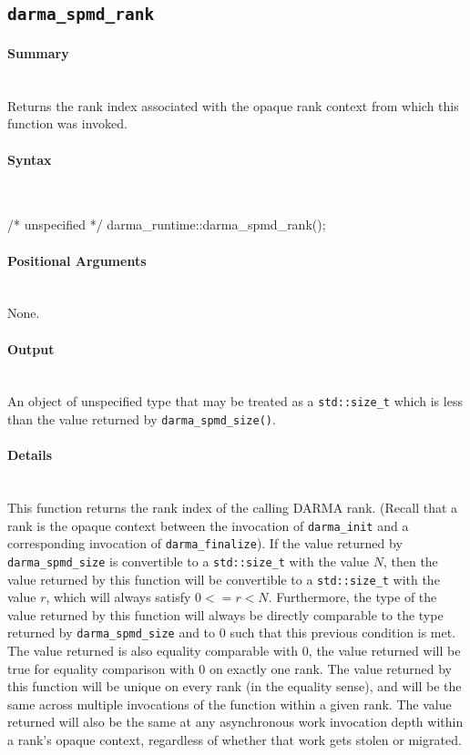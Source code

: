


\subsection{\texttt{darma\_spmd\_rank}}

\paragraph{Summary}\mbox{}\\
Returns the rank index associated with the opaque rank context from which this
function was invoked.

\paragraph{Syntax}\mbox{}\\
\begin{CppCode}
/* unspecified */ darma_runtime::darma_spmd_rank();
\end{CppCode}

\paragraph{Positional Arguments} \mbox{}\\
None. 

\paragraph{Output}\mbox{}\\
An object of unspecified type that may be treated as a \texttt{std::size\_t}
which is less than the value returned by \texttt{darma\_spmd\_size()}.

\paragraph{Details}\mbox{}\\
This function returns the rank index of the calling DARMA rank.  (Recall that a
rank is the opaque context between the invocation of \texttt{darma\_init} and
a corresponding invocation of \texttt{darma\_finalize}).  If the value returned
by \texttt{darma\_spmd\_size} is convertible to a \texttt{std::size\_t} with the
value $N$, then the value returned by this function will be convertible to a
\texttt{std::size\_t} with the value $r$, which will always satisfy $0 <=
r < N$.  Furthermore, the type of the value returned by this function will
always be directly comparable to the type returned by \texttt{darma\_spmd\_size}
and to $0$ such that this previous condition is met.  The value returned is also
equality comparable with $0$, the value returned will be true for equality
comparison with $0$ on exactly one rank.  The value returned by this function
will be unique on every rank (in the equality sense), and will be the same
across multiple invocations of the function within a given rank.  The value
returned will also be the same at any asynchronous work invocation depth within
a rank's opaque context, regardless of whether that work gets stolen or
migrated.


